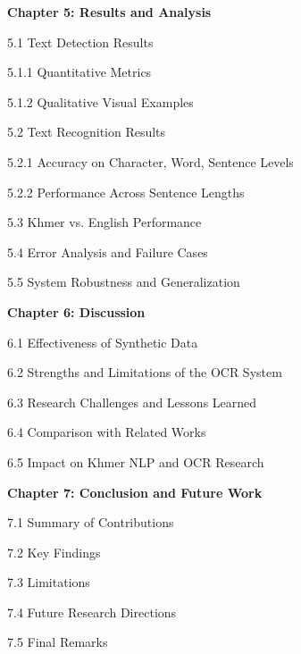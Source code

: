 \begin{adjustwidth}{0.2cm}{0.2cm}
    \vspace{0.5cm}
    {\large \textbf{Chapter 5: Results and Analysis}\dotfill\pageref{ch:results}\par}
    {\large 5.1 Text Detection Results\dotfill\pageref{sec:detection-results}\par}
    {\large \hspace{1cm}5.1.1 Quantitative Metrics\dotfill\pageref{subsec:quantitative}\par}
    {\large \hspace{1cm}5.1.2 Qualitative Visual Examples\dotfill\pageref{subsec:qualitative}\par}
    {\large 5.2 Text Recognition Results\dotfill\pageref{sec:recognition-results}\par}
    {\large \hspace{1cm}5.2.1 Accuracy on Character, Word, Sentence Levels\dotfill\pageref{subsec:accuracy}\par}
    {\large \hspace{1cm}5.2.2 Performance Across Sentence Lengths\dotfill\pageref{subsec:performance}\par}
    {\large 5.3 Khmer vs. English Performance\dotfill\pageref{sec:comparison-results}\par}
    {\large 5.4 Error Analysis and Failure Cases\dotfill\pageref{sec:error-analysis}\par}
    {\large 5.5 System Robustness and Generalization\dotfill\pageref{sec:robustness}\par}

    \vspace{0.5cm}
    {\large \textbf{Chapter 6: Discussion}\dotfill\pageref{ch:discussion}\par}
    {\large 6.1 Effectiveness of Synthetic Data\dotfill\pageref{sec:effectiveness}\par}
    {\large 6.2 Strengths and Limitations of the OCR System\dotfill\pageref{sec:strengths}\par}
    {\large 6.3 Research Challenges and Lessons Learned\dotfill\pageref{sec:challenges}\par}
    {\large 6.4 Comparison with Related Works\dotfill\pageref{sec:related-works}\par}
    {\large 6.5 Impact on Khmer NLP and OCR Research\dotfill\pageref{sec:impact}\par}

    \vspace{0.5cm}
    {\large \textbf{Chapter 7: Conclusion and Future Work}\dotfill\pageref{ch:conclusion}\par}
    {\large 7.1 Summary of Contributions\dotfill\pageref{sec:contributions}\par}
    {\large 7.2 Key Findings\dotfill\pageref{sec:findings}\par}
    {\large 7.3 Limitations\dotfill\pageref{sec:final-limitations}\par}
    {\large 7.4 Future Research Directions\dotfill\pageref{sec:future}\par}
    {\large 7.5 Final Remarks\dotfill\pageref{sec:remarks}\par}


\end{adjustwidth}
